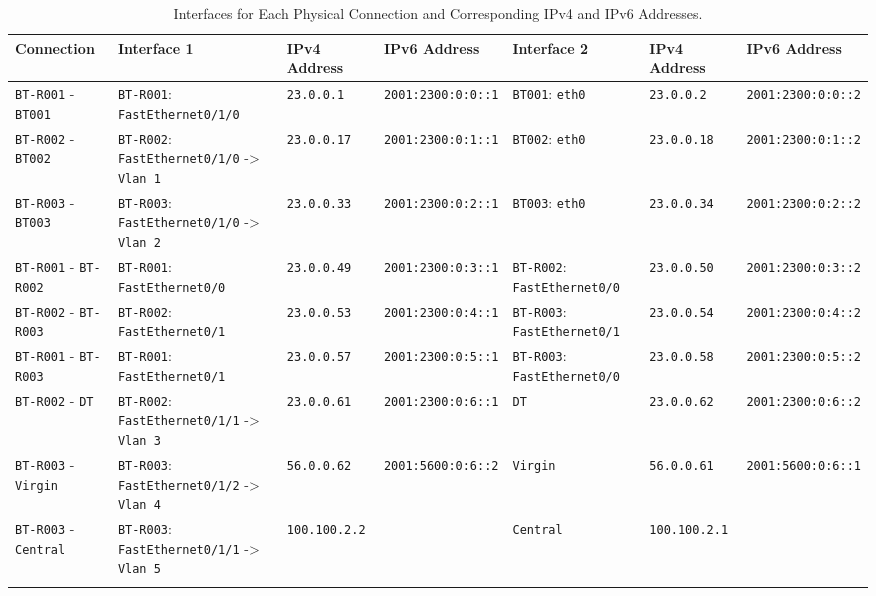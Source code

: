 \begin{landscape}
\scriptsize{
\begin{longtable}[]{@{}lllllll@{}}
\toprule
Connection & Interface 1 & IPv4 Address & IPv6 Address & Interface 2 & IPv4 Address & IPv6
Address \tabularnewline
\midrule
\endhead
\texttt{BT-R001} - \texttt{BT001} & \texttt{BT-R001}:
\texttt{FastEthernet0/1/0} & \texttt{23.0.0.1} &
\texttt{2001:2300:0:0::1} & \texttt{BT001}: \texttt{eth0} &
\texttt{23.0.0.2} & \texttt{2001:2300:0:0::2}\tabularnewline
\texttt{BT-R002} - \texttt{BT002} & \texttt{BT-R002}:
\texttt{FastEthernet0/1/0} -\textgreater{} \texttt{Vlan\ 1} &
\texttt{23.0.0.17} & \texttt{2001:2300:0:1::1} & \texttt{BT002}:
\texttt{eth0} & \texttt{23.0.0.18} &
\texttt{2001:2300:0:1::2}\tabularnewline
\texttt{BT-R003} - \texttt{BT003} & \texttt{BT-R003}:
\texttt{FastEthernet0/1/0} -\textgreater{} \texttt{Vlan\ 2} &
\texttt{23.0.0.33} & \texttt{2001:2300:0:2::1} & \texttt{BT003}:
\texttt{eth0} & \texttt{23.0.0.34} &
\texttt{2001:2300:0:2::2}\tabularnewline
\texttt{BT-R001} - \texttt{BT-R002} & \texttt{BT-R001}:
\texttt{FastEthernet0/0} & \texttt{23.0.0.49} &
\texttt{2001:2300:0:3::1} & \texttt{BT-R002}: \texttt{FastEthernet0/0} &
\texttt{23.0.0.50} & \texttt{2001:2300:0:3::2}\tabularnewline
\texttt{BT-R002} - \texttt{BT-R003} & \texttt{BT-R002}:
\texttt{FastEthernet0/1} & \texttt{23.0.0.53} &
\texttt{2001:2300:0:4::1} & \texttt{BT-R003}: \texttt{FastEthernet0/1} &
\texttt{23.0.0.54} & \texttt{2001:2300:0:4::2}\tabularnewline
\texttt{BT-R001} - \texttt{BT-R003} & \texttt{BT-R001}:
\texttt{FastEthernet0/1} & \texttt{23.0.0.57} &
\texttt{2001:2300:0:5::1} & \texttt{BT-R003}: \texttt{FastEthernet0/0} &
\texttt{23.0.0.58} & \texttt{2001:2300:0:5::2}\tabularnewline
\texttt{BT-R002} - \texttt{DT} & \texttt{BT-R002}:
\texttt{FastEthernet0/1/1} -\textgreater{} \texttt{Vlan\ 3} &
\texttt{23.0.0.61} & \texttt{2001:2300:0:6::1} & \texttt{DT} &
\texttt{23.0.0.62} & \texttt{2001:2300:0:6::2}\tabularnewline
\texttt{BT-R003} - \texttt{Virgin} & \texttt{BT-R003}:
\texttt{FastEthernet0/1/2} -\textgreater{} \texttt{Vlan\ 4} &
\texttt{56.0.0.62} & \texttt{2001:5600:0:6::2} & \texttt{Virgin} &
\texttt{56.0.0.61} & \texttt{2001:5600:0:6::1}\tabularnewline
\texttt{BT-R003} - \texttt{Central} & \texttt{BT-R003}:
\texttt{FastEthernet0/1/1} -\textgreater{} \texttt{Vlan\ 5} &
\texttt{100.100.2.2} & & \texttt{Central} & \texttt{100.100.2.1}
&\tabularnewline
\bottomrule
\caption{Interfaces for Each Physical Connection and Corresponding IPv4 and IPv6 Addresses.}
\label{tab:interfaces}
\end{longtable}
}

\end{landscape}
